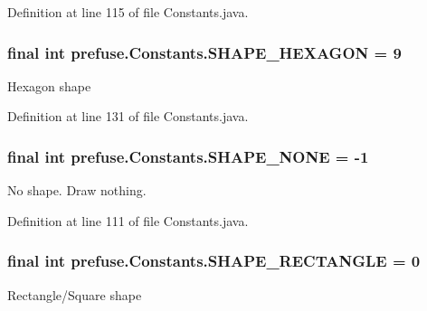 \-Definition at line 115 of file \-Constants.\-java.

\hypertarget{interfaceprefuse_1_1_constants_a7ebd12625cb87984d166dba525c363bd}{
\subsubsection[{\-S\-H\-A\-P\-E\-\_\-\-H\-E\-X\-A\-G\-O\-N}]{\setlength{\rightskip}{0pt plus 5cm}final int {\bf prefuse.\-Constants.\-S\-H\-A\-P\-E\-\_\-\-H\-E\-X\-A\-G\-O\-N} = 9}}\label{interfaceprefuse_1_1_constants_a7ebd12625cb87984d166dba525c363bd}
\-Hexagon shape 

\-Definition at line 131 of file \-Constants.\-java.

\hypertarget{interfaceprefuse_1_1_constants_ac2654600d5b17de95e333c1a311e498a}{
\subsubsection[{\-S\-H\-A\-P\-E\-\_\-\-N\-O\-N\-E}]{\setlength{\rightskip}{0pt plus 5cm}final int {\bf prefuse.\-Constants.\-S\-H\-A\-P\-E\-\_\-\-N\-O\-N\-E} = -\/1}}\label{interfaceprefuse_1_1_constants_ac2654600d5b17de95e333c1a311e498a}
\-No shape. \-Draw nothing. 

\-Definition at line 111 of file \-Constants.\-java.

\hypertarget{interfaceprefuse_1_1_constants_a8a7f76b02d7539cafc7e79d7447e0dc3}{
\subsubsection[{\-S\-H\-A\-P\-E\-\_\-\-R\-E\-C\-T\-A\-N\-G\-L\-E}]{\setlength{\rightskip}{0pt plus 5cm}final int {\bf prefuse.\-Constants.\-S\-H\-A\-P\-E\-\_\-\-R\-E\-C\-T\-A\-N\-G\-L\-E} = 0}}\label{interfaceprefuse_1_1_constants_a8a7f76b02d7539cafc7e79d7447e0dc3}
\-Rectangle/\-Square shape 

